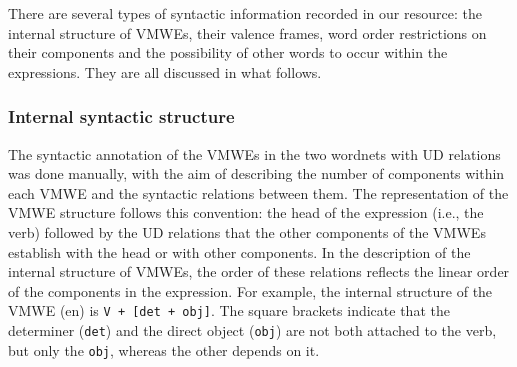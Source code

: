 \documentclass[output=paper,colorlinks,citecolor=brown]{langscibook}
\begin{document}
There are several types of syntactic information recorded in our resource: the internal structure of VMWEs, their valence frames, word order restrictions on their components and the possibility of other words to occur within the expressions. They are all discussed in what follows.

\subsubsection{Internal syntactic structure}

The syntactic annotation of the VMWEs in the two wordnets with UD relations was done manually, with the aim of describing the number of components within each VMWE and the syntactic relations between them. The representation of the VMWE structure follows this convention: the head of the expression (i.e., the verb) followed by the UD relations that the other components of the VMWEs establish with the head or with other components. In the description of the internal structure of VMWEs, the order of these relations reflects the linear order of the components in the expression. For example, the internal structure of the VMWE (en)  is \texttt{V + [det + obj]}. The square brackets indicate that the determiner (\texttt{det}) and the direct object (\texttt{obj}) are not both attached to the verb, but only the \texttt{obj}, whereas the other depends on it.
\end{document}
